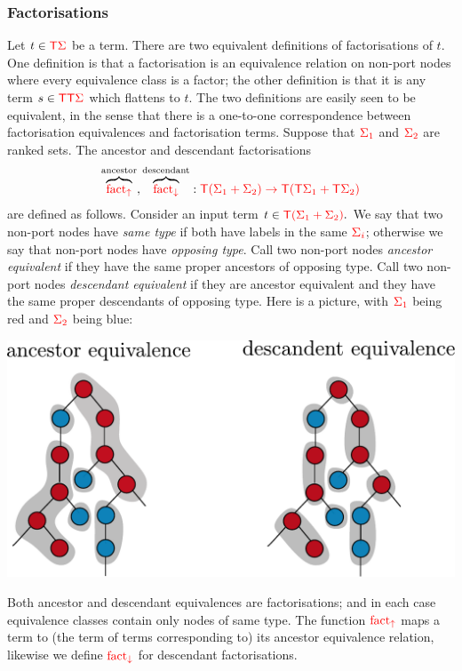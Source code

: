 \subsubsection{Factorisations}
    Let $t \in {\color{red}{\mathsf T}} {\color{red}{\Sigma}}$ be a term. 
    There are two equivalent definitions of factorisations of $t$. One definition is that a factorisation is an equivalence relation on non-port nodes where every equivalence class is a factor; the other definition is that it is any term $s  \in {\color{red}{\mathsf T}} {\color{red}{\mathsf T}} {\color{red}{\Sigma}}$ which flattens to $t$. 
    The two definitions are easily seen to be equivalent, in the sense that there is a one-to-one correspondence between factorisation equivalences and factorisation terms.
    Suppose that ${\color{red}{\Sigma_1}}$ and ${\color{red}{\Sigma_2}}$ are ranked sets. The ancestor and descendant factorisations 
        \begin{align*}
            \overbrace{{\color{red}{\mathrm{fact_{\uparrow}}}}}^{\text{ancestor}}, \overbrace{{\color{red}{\mathrm{fact_{\downarrow}}}}}^{\text{descendant}}  : {\color{red}{{\color{red}{\mathsf T}}(\Sigma_1+\Sigma_2) \to {\color{red}{\mathsf T}}({\color{red}{\mathsf T}}\Sigma_1 + {\color{red}{\mathsf T}}\Sigma_2)}}
        \end{align*}
        are defined as follows. Consider an input term
            $t \in {\color{red}{{\color{red}{\mathsf T}}(\Sigma_1+\Sigma_2)}}.$
        We say that two non-port nodes have \emph{same type} if both have labels in the same  ${\color{red}{\Sigma_i}}$; otherwise we say that non-port nodes have \emph{opposing type}.  Call two non-port nodes \emph{ancestor equivalent}  if they have the same proper ancestors of opposing type. Call two non-port nodes \emph{descendant equivalent}  if they  are ancestor equivalent and they have the same proper descendants of opposing type. Here is a picture, with ${\color{red}{\Sigma_1}}$ being red and ${\color{red}{\Sigma_2}}$ being blue: 
        \begin{center}
      \includegraphics[scale=.35]{facto-up-down.pdf}
        \end{center}
        Both ancestor and descendant equivalences are factorisations; and in each case equivalence classes contain only nodes of same type.  The function ${\color{red}{\mathrm{fact_{\uparrow}}}}$ maps a term to (the term of terms corresponding to) its ancestor equivalence relation, likewise we define ${\color{red}{\mathrm{fact_{\downarrow}}}}$ for  descendant factorisations.
    
